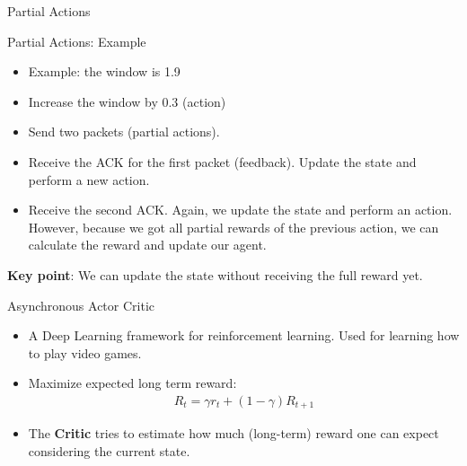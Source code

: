 \documentclass[11pt]{beamer}
\begin{document}
\begin{frame}{Partial Actions}
\centering

\end{frame}

\begin{frame}{Partial Actions: Example}
\begin{itemize}
\item Example: the window is 1.9
\item Increase the window by $0.3$ (action)
\item Send two packets (partial actions).  
\item Receive the ACK for the first packet (feedback). Update the state and perform a new action.
\item Receive the second ACK. Again, we update the state and perform an action. However, because we got all partial rewards of the previous action, we can calculate the reward and update our agent.
\end{itemize}
\textbf{Key point}: We can update the state without receiving the full reward yet.
\end{frame}


\begin{frame}{Asynchronous Actor Critic}
\begin{itemize}
\item A Deep Learning framework for reinforcement learning. Used for learning how to play video games.
\item Maximize expected long term reward: \begin{align*}
R_t = \gamma r_t + (1-\gamma) R_{t+1}
\end{align*}
\item The \textbf{Critic} tries to estimate how much (long-term) reward one can expect considering the current state.
\end{itemize}
\end{frame}
\end{document}
